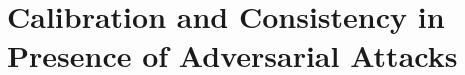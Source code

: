 \chapter{Calibration and Consistency in Presence of Adversarial Attacks}
\label{chap:calibration}

\minitoc


% 
% 


% 

